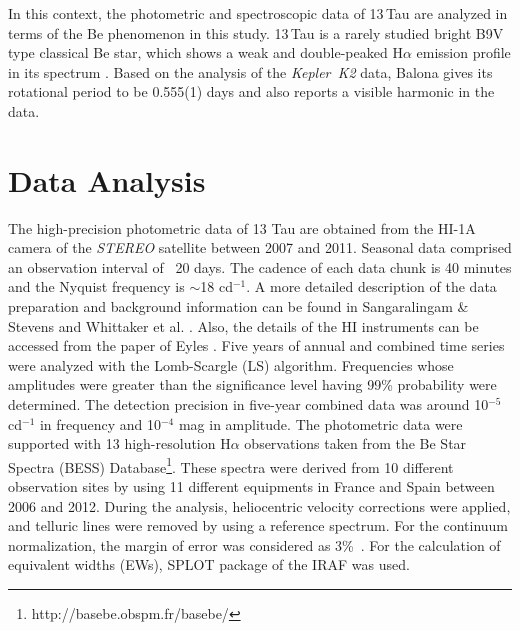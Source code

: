 \documentclass[]{article}
\begin{document}
In this context, the photometric and spectroscopic data of 13\,Tau are analyzed in terms of the Be phenomenon in this study. 13\,Tau is a rarely studied bright B9V type classical Be star, which shows a weak and double-peaked H{$\alpha$} emission profile in its spectrum \cite{Slettebak1982}. Based on the analysis of the {\sl Kepler~K2} data, Balona \cite{Balona2016} gives its rotational period to be 0.555(1) days and also reports a visible harmonic in the data. 


\section{Data Analysis}

The high-precision photometric data of 13 Tau are obtained from the HI-1A camera of the {\sl STEREO} satellite between 2007 and 2011. Seasonal data comprised an observation interval of ~20 days. The cadence of each data chunk is 40 minutes and the Nyquist frequency is $\sim$18 cd$^{-1}$. A more detailed description of the data preparation and background information can be found in Sangaralingam \& Stevens \cite{ss2011} and Whittaker et al. \cite{Whittaker2013}. Also, the details of the HI instruments can be accessed from the paper of Eyles \cite{Eyles2009}. Five years of annual and combined time series were analyzed with the Lomb-Scargle (LS) algorithm. Frequencies whose amplitudes were greater than the significance level having 99\% probability were determined. The detection precision in five-year combined data was around 10$^{-5}$ cd$^{-1}$ in frequency and 10$^{-4}$ mag in amplitude. The photometric data were supported with 13 high-resolution H{$\alpha$} observations taken from the Be Star Spectra (BESS) Database\footnote{http://basebe.obspm.fr/basebe/}. These spectra were derived from 10 different observation sites by using 11 different equipments in France and Spain between 2006 and 2012. During the analysis, heliocentric velocity corrections were applied, and telluric lines were removed by using a reference spectrum. For the continuum normalization, the margin of error was considered as 3\%\ \cite{Jones2011}. For the calculation of equivalent widths (EWs), SPLOT package of the IRAF was used. 
  
\end{document}
